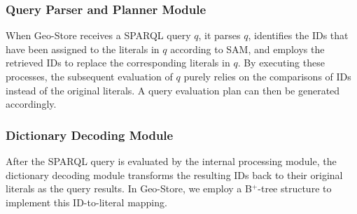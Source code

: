 \subsubsection{Query Parser and Planner Module}

When Geo-Store receives a SPARQL query $q$, it parses $q$, identifies the IDs that have been assigned to the literals in $q$ according to SAM, and employs the retrieved IDs to replace the corresponding literals in $q$. By executing these processes, the subsequent evaluation of $q$ purely relies on the comparisons of IDs instead of the original literals. A query evaluation plan can then be generated accordingly.

\subsubsection{Dictionary Decoding Module}

After the SPARQL query is evaluated by the internal processing module, the dictionary decoding module transforms the resulting IDs back to their original literals as the query results. In Geo-Store, we employ a B$^{+}$-tree structure to implement this ID-to-literal mapping.